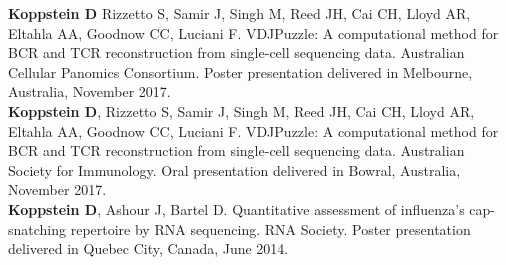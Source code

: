 \documentclass[10pt,a4paper]{article}
\begin{document}
{{{{{\noindent \textbf{Koppstein D} Rizzetto S, Samir J, Singh M, Reed JH, Cai CH, Lloyd AR, Eltahla AA, Goodnow CC, Luciani F. VDJPuzzle: A computational method for BCR and TCR reconstruction from single-cell sequencing data. Australian Cellular Panomics Consortium. Poster presentation delivered in Melbourne, Australia, November 2017.} \vspace{-0.8em} \\

{\noindent \textbf{Koppstein D}, Rizzetto S, Samir J, Singh M, Reed JH, Cai CH, Lloyd AR, Eltahla AA, Goodnow CC, Luciani F. VDJPuzzle: A computational method for BCR and TCR reconstruction from single-cell sequencing data. Australian Society for Immunology. Oral presentation delivered in Bowral, Australia, November 2017.} \vspace{-0.8em} \\

{\noindent \textbf{Koppstein D}, Ashour J, Bartel D. Quantitative assessment of influenza's cap-snatching repertoire by RNA sequencing. RNA Society. Poster presentation delivered in Quebec City, Canada, June 2014.}

\spacedhrule{1.3em}{-0.4em}  %


{
}

\vspace{-0.3em}

{ \vspace{-0.2em}
}

\vspace{0.1in}

\spacedhrule{0.1em}{-0.2em}  %

}}}}
\end{document}
